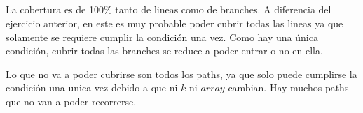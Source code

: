 \subsection{}
La cobertura es de 100\% tanto de lineas como de branches. A diferencia del ejercicio anterior, en este es muy probable poder cubrir todas las lineas ya que solamente se requiere cumplir la condición una vez. Como hay una única condición, cubrir todas las branches se reduce a poder entrar o no en ella.

Lo que no va a poder cubrirse son todos los paths, ya que solo puede cumplirse la condición una unica vez debido a que ni $k$ ni $array$ cambian. Hay muchos paths que no van a poder recorrerse.

\subsection{}
